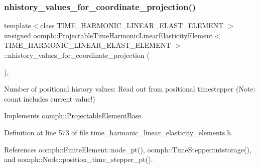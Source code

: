 \subsubsection{\texorpdfstring{nhistory\+\_\+values\+\_\+for\+\_\+coordinate\+\_\+projection()}{nhistory\_values\_for\_coordinate\_projection()}}
{\footnotesize\ttfamily template$<$class T\+I\+M\+E\+\_\+\+H\+A\+R\+M\+O\+N\+I\+C\+\_\+\+L\+I\+N\+E\+A\+R\+\_\+\+E\+L\+A\+S\+T\+\_\+\+E\+L\+E\+M\+E\+NT $>$ \\
unsigned \hyperlink{classoomph_1_1ProjectableTimeHarmonicLinearElasticityElement}{oomph\+::\+Projectable\+Time\+Harmonic\+Linear\+Elasticity\+Element}$<$ T\+I\+M\+E\+\_\+\+H\+A\+R\+M\+O\+N\+I\+C\+\_\+\+L\+I\+N\+E\+A\+R\+\_\+\+E\+L\+A\+S\+T\+\_\+\+E\+L\+E\+M\+E\+NT $>$\+::nhistory\+\_\+values\+\_\+for\+\_\+coordinate\+\_\+projection (\begin{DoxyParamCaption}{ }\end{DoxyParamCaption})\hspace{0.3cm}{\ttfamily [inline]}, {\ttfamily [virtual]}}



Number of positional history values\+: Read out from positional timestepper (Note\+: count includes current value!) 



Implements \hyperlink{classoomph_1_1ProjectableElementBase_ab4ecd0cd24000a3ed675dc7198203c1f}{oomph\+::\+Projectable\+Element\+Base}.



Definition at line 573 of file time\+\_\+harmonic\+\_\+linear\+\_\+elasticity\+\_\+elements.\+h.



References oomph\+::\+Finite\+Element\+::node\+\_\+pt(), oomph\+::\+Time\+Stepper\+::ntstorage(), and oomph\+::\+Node\+::position\+\_\+time\+\_\+stepper\+\_\+pt().

\mbox{\label{classoomph_1_1ProjectableTimeHarmonicLinearElasticityElement_a4615e8cf28f14603d0215006db2218fc}} 
